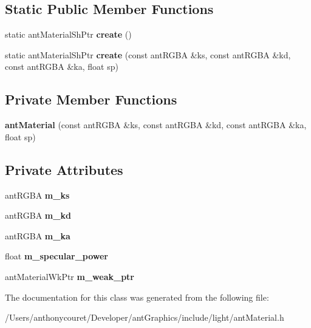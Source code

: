 \subsection*{Static Public Member Functions}
\begin{DoxyCompactItemize}
\item 
\hypertarget{classant_material_a56f8f32c820e73b5944519d3e292dc37}{static ant\+Material\+Sh\+Ptr {\bfseries create} ()}\label{classant_material_a56f8f32c820e73b5944519d3e292dc37}

\item 
\hypertarget{classant_material_af41bd92b1e438fdcef620d225f1164d1}{static ant\+Material\+Sh\+Ptr {\bfseries create} (const ant\+R\+G\+B\+A \&ks, const ant\+R\+G\+B\+A \&kd, const ant\+R\+G\+B\+A \&ka, float sp)}\label{classant_material_af41bd92b1e438fdcef620d225f1164d1}

\end{DoxyCompactItemize}
\subsection*{Private Member Functions}
\begin{DoxyCompactItemize}
\item 
\hypertarget{classant_material_a243812f97a9ba3baf5a4688b8ff2af23}{{\bfseries ant\+Material} (const ant\+R\+G\+B\+A \&ks, const ant\+R\+G\+B\+A \&kd, const ant\+R\+G\+B\+A \&ka, float sp)}\label{classant_material_a243812f97a9ba3baf5a4688b8ff2af23}

\end{DoxyCompactItemize}
\subsection*{Private Attributes}
\begin{DoxyCompactItemize}
\item 
\hypertarget{classant_material_ae0144cb7c18b85e361558bc1e8856381}{ant\+R\+G\+B\+A {\bfseries m\+\_\+ks}}\label{classant_material_ae0144cb7c18b85e361558bc1e8856381}

\item 
\hypertarget{classant_material_acbb5f8f6e82a2e6535ac4f0199c27cee}{ant\+R\+G\+B\+A {\bfseries m\+\_\+kd}}\label{classant_material_acbb5f8f6e82a2e6535ac4f0199c27cee}

\item 
\hypertarget{classant_material_a861d87f61edd40d3637c369fb6ae0aed}{ant\+R\+G\+B\+A {\bfseries m\+\_\+ka}}\label{classant_material_a861d87f61edd40d3637c369fb6ae0aed}

\item 
\hypertarget{classant_material_a0502d987cd803cb7071b8bd40b66eb67}{float {\bfseries m\+\_\+specular\+\_\+power}}\label{classant_material_a0502d987cd803cb7071b8bd40b66eb67}

\item 
\hypertarget{classant_material_a4826c122273dac93756ecc116e92b83e}{ant\+Material\+Wk\+Ptr {\bfseries m\+\_\+weak\+\_\+ptr}}\label{classant_material_a4826c122273dac93756ecc116e92b83e}

\end{DoxyCompactItemize}


The documentation for this class was generated from the following file\+:\begin{DoxyCompactItemize}
\item 
/\+Users/anthonycouret/\+Developer/ant\+Graphics/include/light/ant\+Material.\+h\end{DoxyCompactItemize}

